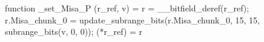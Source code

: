 function _set_Misa_P (r_ref, v) = {
    r = __bitfield_deref(r_ref);
    r.Misa_chunk_0 = update_subrange_bits(r.Misa_chunk_0, 15, 15, subrange_bits(v, 0, 0));
    (*r_ref) = r
}
